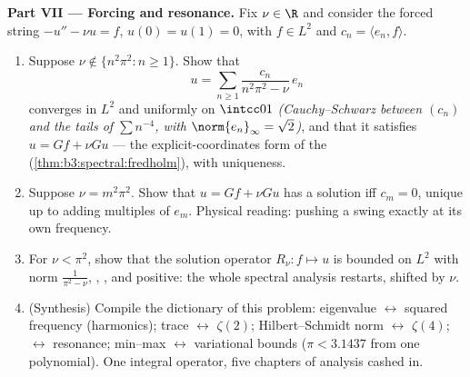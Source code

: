 \begin{problem}
\medskip
\noindent\textbf{Part VII --- Forcing and resonance.} Fix
$\nu \in \R$ and consider the forced string $-u'' - \nu u =
f$, $u(0) = u(1) = 0$, with $f \in L^2$ and $c_n = \langle
e_n, f\rangle$.
\begin{enumerate}[resume]
  \item Suppose $\nu \notin \{n^2\pi^2 : n \geq 1\}$. Show
        that
        \[
        u = \sum_{n\geq1}\frac{c_n}{n^2\pi^2 - \nu}\,e_n
        \]
        converges in $L^2$ and uniformly on $\intcc01$
        \emph{(Cauchy--Schwarz between $(c_n)$ and the tails
        of $\sum n^{-4}$, with $\norm{e_n}_\infty =
        \sqrt2$)}, and that it satisfies $u = Gf + \nu Gu$
        --- the explicit-coordinates form of the  (\cref{thm:b3:spectral:fredholm}), with
        uniqueness.
  \item Suppose $\nu = m^2\pi^2$. Show that $u = Gf + \nu
        Gu$ has a solution iff $c_m = 0$, unique up to
        adding multiples of $e_m$. Physical reading: pushing
        a swing exactly at its own frequency.
  \item For $\nu < \pi^2$, show that the solution operator
        $R_\nu\colon f \mapsto u$ is bounded on $L^2$ with
        norm $\frac1{\pi^2 - \nu}$, , ,
        and positive: the whole spectral analysis restarts,
        shifted by $\nu$.
  \item (Synthesis) Compile the dictionary of this problem:
        eigenvalue $\leftrightarrow$ squared frequency
        (harmonics); trace $\leftrightarrow$ $\zeta(2)$;
        Hilbert--Schmidt norm $\leftrightarrow$ $\zeta(4)$;
         $\leftrightarrow$ resonance;
        min--max $\leftrightarrow$ variational bounds ($\pi <
        3.1437$ from one polynomial). One integral operator,
        five chapters of analysis cashed in.
\end{enumerate}


\end{problem}
